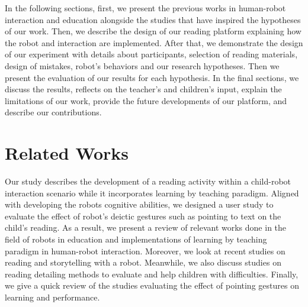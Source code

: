 \documentclass{sigchi}
\begin{document}
In the following sections, first, we present the previous works in human-robot interaction and education alongside the studies that have inspired the hypotheses of our work. 
Then, we describe the design of our reading platform explaining how the robot and interaction are implemented. 
After that, we demonstrate the design of our experiment with details about participants, selection of reading materials, design of mistakes, robot's behaviors and our research hypotheses. 
Then we present the evaluation of our results for each hypothesis. 
In the final sections, we discuss the results, reflects on the teacher's and children's input, explain the limitations of our work, provide the future developments of our platform, and describe our contributions.




\section{Related Works}

Our study describes the development of a reading activity within a child-robot interaction scenario while it incorporates learning by teaching paradigm.
Aligned with developing the robots cognitive abilities, we designed a user study to evaluate the effect of robot's deictic gestures such as pointing to text on the child's reading. 
As a result, we present a review of relevant works done in the field of robots in education and implementations of learning by teaching paradigm in human-robot interaction. 
Moreover, we look at recent studies on reading and storytelling with a robot.
Meanwhile, we also discuss studies on reading detailing methods to evaluate and help children with difficulties.
Finally, we give a quick review of the studies evaluating the effect of pointing gestures on learning and performance.
\end{document}
